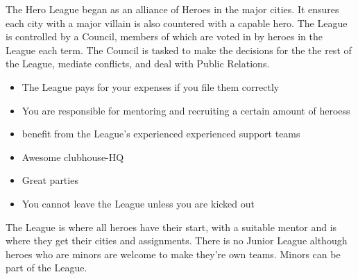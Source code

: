 \documentclass[blue]{LRSguildcamp1}
\begin{document}
\name{\bHeroLeague{}}


The Hero League began as an alliance of Heroes in the major cities. It ensures each city with a major villain is also countered with a capable hero. The League is controlled by a Council, members of which are voted in by heroes in the League each term. The Council is tasked to make the decisions for the the rest of the League, mediate conflicts, and deal with Public Relations.  

\begin{itemize}
\item The League pays for your expenses if you file them correctly 
\item You are responsible for mentoring and recruiting a certain amount of heroess
\item benefit from the League's experienced experienced support teams
\item Awesome clubhouse-HQ
\item Great parties
\item You cannot leave the League unless you are kicked out
\end{itemize}

The League is where all heroes have their start, with a suitable mentor and is where they get their cities and assignments. There is no Junior League although heroes who are minors are welcome to make they're own teams. Minors can be part of the League. 
\end{document}
